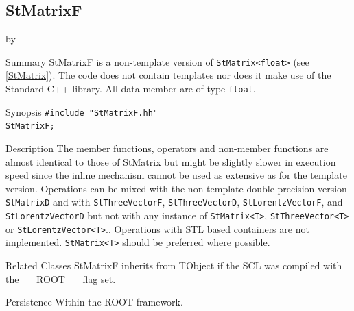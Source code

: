 \documentclass[twoside]{article}
\newcommand{\name}[1]{\textsf{#1}}%
\newcommand{\entrylabel}[1]{\mbox{\textbf{{#1}}}\hfil}%
\newenvironment{entry}
{\begin{list}{}%
    {\renewcommand{\makelabel}{\entrylabel}%
     \setlength{\labelwidth}{90pt}%
     \setlength{\leftmargin}{\labelwidth}
     \advance\leftmargin by \labelsep%
      }%
    }%
  {\end{list}}
\newcommand{\Entrylabel}[1]%
{\raisebox{0pt}[1ex][0pt]{\makebox[\labelwidth][l]%
    {\parbox[t]{\labelwidth}{\hspace{0pt}\textbf{{#1}}}}}}
\newenvironment{Entry}%
{\renewcommand{\entrylabel}{\Entrylabel}\begin{entry}}%
  {\end{entry}}
\begin{document}
\subsection{StMatrixF } \label{StMatrixF}
\begin{Entry}
\item[Summary]
    StMatrixF is a non-template version of \verb+StMatrix<float>+
    (see \ref{StMatrix}). The code does not contain templates nor
    does it make use of the Standard C++ library. All data member are of
    type \texttt{float}.
    
\item[Synopsis]
    \verb+#include "StMatrixF.hh"+ \\
    \verb+StMatrixF;+
    
    
\item[Description]       
    The member functions, operators and non-member functions are almost identical
    to those of StMatrix but might be slightly slower in execution speed
    since the inline mechanism cannot be used as extensive as for the template
    version. Operations can be mixed with the non-template double precision version
    \texttt{StMatrixD} and with \texttt{StThreeVectorF}, \texttt{StThreeVectorD},
    \texttt{StLorentzVectorF}, and \texttt{StLorentzVectorD}
    but not with any instance of \verb+StMatrix<T>+, \verb+StThreeVector<T>+ or
    \verb+StLorentzVector<T>+..
    Operations with STL based containers are not implemented.
    \verb+StMatrix<T>+ should be preferred where possible.
    
\item[Related Classes]
    StMatrixF inherits from TObject 
    if the SCL was compiled with the \name{\_\_ROOT\_\_} flag set.

\item[Persistence]
    Within the ROOT framework.

\end{Entry}

%
%
\end{document}
